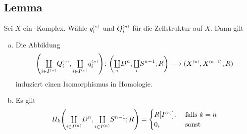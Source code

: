 \subsection[Lemma über $\enbrace{\coprod Q_i^\ssbrace{n}, \coprod q_i^\ssbrace{n}}_* $ und $H_k \enbrace{\coprod_i D^n, \coprod_i S^{n-1};R}$]{Lemma} %
\label{sub:125}
Sei $X$ ein \CW-Komplex. Wähle $q_i^{\scriptscriptstyle(n)}$ und $Q_i^{\scriptscriptstyle(n)}$ für die Zellstruktur auf $X$. Dann gilt
\begin{enumerate}[a)]
	\item Die Abbildung
	\[
		\enbrace*{{\textstyle\coprod\limits_{i \in I^{(n)}}} Q_i^\ssbrace{n}, {\textstyle\coprod\limits_{i \in I^{(n)}}} q_i^\ssbrace{n}} 
		\colon \enbrace*{{\textstyle\coprod\limits_i} D^n, {\textstyle\coprod\limits_i} S^{n-1};R}  \longrightarrow
		\enbrace*{X^\ssbrace{n}, X^\ssbrace{n-1};R} 
	\]
	induziert einen Isomorphismus in Homologie.
	\item Es gilt
	\[
		H_k \enbrace*{{\textstyle\coprod\limits_{i\in I^\ssbrace{n}}} D^n, {\textstyle\coprod\limits_{i\in I^\ssbrace{n}}} S^{n-1};R} = \begin{cases}
			R[I^\ssbrace{n}], &\text{ falls }k=n\\
			0, & \text{ sonst}
		\end{cases}
	\] 
\end{enumerate}
